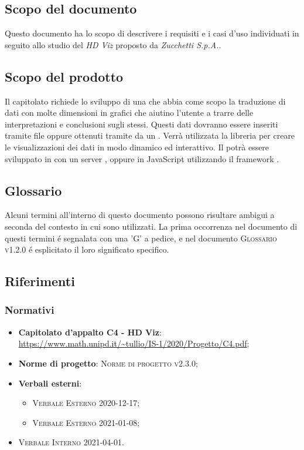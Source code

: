 \documentclass[../analisi_dei_requisiti.tex]{subfiles}
\begin{document}
\subsection{Scopo del documento}%
\label{sub:scopo_del_documento}
Questo documento ha lo scopo di descrivere i requisiti e i casi d'uso individuati in seguito allo studio del  \emph{HD Viz} proposto da \emph{Zucchetti S.p.A.}.

\subsection{Scopo del prodotto}%
\label{sub:scopo_del_prodotto}
Il capitolato richiede lo sviluppo di una  che abbia come scopo la
traduzione di dati con molte dimensioni in grafici che aiutino l’utente a trarre delle interpretazioni e conclusioni sugli stessi.
Questi dati dovranno essere inseriti tramite file  oppure ottenuti tramite  da un .
Verrà utilizzata la libreria   per creare le visualizzazioni dei dati in modo dinamico ed interattivo.
Il  potrà essere sviluppato in  con un server ,  oppure
in JavaScript utilizzando il framework .


\subsection{Glossario}
\label{sub:glossario}
Alcuni termini all'interno di questo documento possono risultare ambigui a seconda del contesto in cui sono utilizzati.
La prima occorrenza nel documento di questi termini é segnalata con una 'G' a pedice, e nel documento
\textsc{Glossario v1.2.0} é esplicitato il loro significato specifico.


\subsection{Riferimenti}
\label{sub:riferimenti}

\subsubsection{Normativi}%
\label{ssub:normativi}


\begin{itemize}
  \item \textbf{Capitolato d'appalto C4 - HD Viz}: \\
        \url{https://www.math.unipd.it/~tullio/IS-1/2020/Progetto/C4.pdf};
  \item \textbf{Norme di progetto}: \textsc{Norme di progetto v2.3.0};
  \item \textbf{Verbali esterni}:
        \begin{itemize}
          \item \textsc{Verbale Esterno 2020-12-17};
          \item \textsc{Verbale Esterno 2021-01-08};
        \end{itemize}
  \item \textsc{Verbale Interno 2021-04-01}.
\end{itemize}
\end{document}

